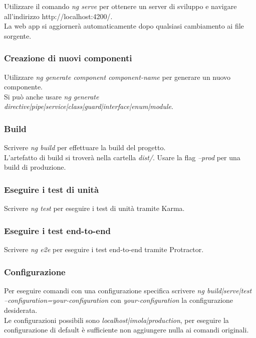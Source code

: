 \documentclass[../manuale-sviluppatore.tex]{subfiles}
\begin{document}
Utilizzare il comando \emph{ng serve} per ottenere un server di sviluppo e navigare all'indirizzo http://localhost:4200/. \\
La web app si aggiornerà automaticamente dopo qualsiasi cambiamento ai file sorgente.

\subsubsection{Creazione di nuovi componenti}

Utilizzare \emph{ng generate component component-name} per generare un nuovo componente.\\
Si può anche usare \emph{ng generate directive|pipe|service|class|guard|interface|enum|module}.

\subsubsection{Build}

Scrivere \emph{ng build} per effettuare la build del progetto. \\
L'artefatto di build si troverà nella cartella \emph{dist/}. Usare la flag \emph{--prod} per una build di produzione. 

\subsubsection{Eseguire i test di unità}

Scrivere \emph{ng test} per eseguire i test di unità tramite Karma.

\subsubsection{Eseguire i test end-to-end}

Scrivere \emph{ng e2e} per eseguire i test end-to-end tramite Protractor.

\subsubsection{Configurazione}

Per eseguire comandi con una configurazione specifica scrivere \emph{ng build|serve|test --configuration=your-configuration} con \emph{your-configuration} la configurazione desiderata. \\
Le configurazioni possibili sono \emph{localhost|imola|production}, per eseguire la configurazione di default è sufficiente non aggiungere nulla ai comandi originali.
\end{document}
